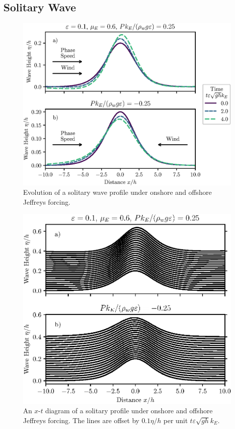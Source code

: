 \documentclass{jfm}
\let\Oldsubsection\subsection
\renewcommand{\subsection}{\FloatBarrier\Oldsubsection}
\renewcommand*{\epsilon}{\varepsilon}
\begin{document}
\subsection{Solitary Wave}
\begin{figure}
  \centering
  \includegraphics{Snapshots-Positive-Negative.eps}
  \caption{
    Evolution of a solitary wave profile under onshore and offshore Jeffreys
    forcing.
  }
\end{figure}

\begin{figure}
  \centering
  \includegraphics{XT-Offset.eps}
  \caption{
    An $x$-$t$ diagram of a solitary profile under onshore and offshore
    Jeffreys forcing.
    The lines are offset by $0.1 \eta/h$ per unit $t \epsilon \sqrt{g h}
    k_E$.
  }
\end{figure}
\end{document}
